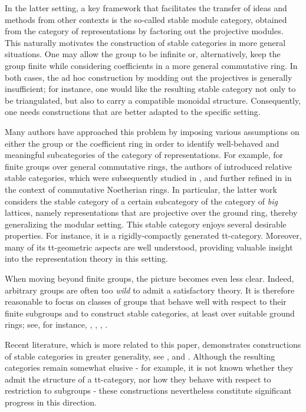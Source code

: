 \documentclass{amsart}
\numberwithin{equation}{section}%
\theoremstyle{remark}
\begin{document}
In the latter setting, a key framework that facilitates the transfer of ideas and methods from other contexts is the so-called stable module category, obtained from the category of representations by factoring out the projective modules. This naturally motivates the construction of stable categories in more general situations. One may allow the group to be infinite or, alternatively, keep the group finite while considering coefficients in a more general commutative ring. In both cases, the ad hoc construction by modding out the projectives is generally insufficient; for instance, one would like the resulting stable category not only to be triangulated, but also to carry a compatible monoidal structure. Consequently, one needs constructions that are better adapted to the specific setting.


Many authors have approached this problem by imposing various assumptions on either the group or the coefficient ring in order to identify well-behaved and meaningful subcategories of the category of representations. For example, for finite groups over general commutative rings, the authors of \cite{benson2013module} introduced relative stable categories, which were subsequently studied in \cite{baland2015prime}, \cite{baland2019comparisons} and further refined in \cite{BBIKP25} in the context of commutative Noetherian rings. In particular, the latter work considers the stable category of a certain subcategory of the category of \textit{big} lattices, namely representations that are projective over the ground ring, thereby generalizing the modular setting. This stable category enjoys several desirable properties. For instance, it is a rigidly-compactly generated tt-category. Moreover, many of its tt-geometric aspects are well understood, providing valuable insight into the representation theory in this setting.

When moving beyond finite groups, the picture becomes even less clear. Indeed, arbitrary groups are often too \textit{wild} to admit a satisfactory theory. It is therefore reasonable to focus on classes of groups that behave well with respect to their finite subgroups and to construct stable categories, at least over suitable ground rings; see, for instance, \cite{benson97}, \cite{CEKO14}, \cite{MS19}, \cite{Gom24}. 

Recent literature, which is more related to this paper, demonstrates constructions of stable categories in greater generality, see \cite{ET_cof}, and \cite{emmanouil2025monoidal}. Although the resulting categories remain somewhat elusive - for example, it is not known whether they admit the structure of a tt-category, nor how they behave with respect to restriction to subgroups - these constructions nevertheless constitute significant progress in this direction.
\end{document}
